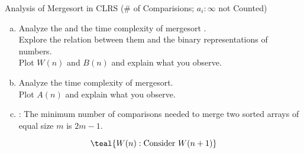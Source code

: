 
\begin{frame}{}

  \begin{columns}
  \end{columns}
\end{frame}

\begin{frame}{}
  \begin{exampleblock}{Analysis of Mergesort in CLRS (\# of Comparisions; $a_i : \infty$ not Counted)}
    \begin{enumerate}[(a)]
      \setlength{\itemsep}{5pt}
      \item Analyze the  and the  
	time complexity of mergesort . \\
	Explore the relation between them and the binary representations of numbers. \\
	Plot $W(n)$ and $B(n)$ and explain what you observe.
      \item Analyze the  time complexity of mergesort. \\
	Plot $A(n)$ and explain what you observe.
      \item {}: 
	The minimum number of comparisons needed to merge two sorted arrays of equal size $m$ is $2m - 1$.
    \end{enumerate}
  \end{exampleblock}

  \pause
  \[
    \teal{W(n): \text{Consider } W(n+1)}
  \]
\end{frame}
